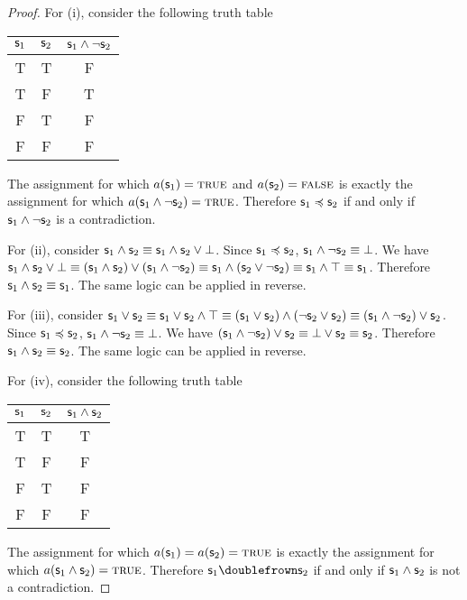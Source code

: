 \documentclass[11pt,letterpaper,fleqn]{memoir} %
\begin{document}
\begin{mathSection}
\begin{proof}
	For (i), consider the following truth table 
\begin{center}
	\begin{tabular}{c|c|c}
		$\mathsf{s}_1$ & $\mathsf{s}_2$ & $\mathsf{s}_1 \wedge \neg \mathsf{s}_2$\\
		\hline
		T & T & F \\
		T & F & T \\
		F & T & F \\
		F & F & F \\
	\end{tabular}
\end{center}
	The assignment for which $a(\mathsf{s}_1) = \textsc{true}$ and $a(\mathsf{s}_2) = \textsc{false}$ is exactly the assignment for which $a(\mathsf{s}_1 \wedge \neg \mathsf{s}_2) = \textsc{true}$. Therefore $\mathsf{s}_1 \preccurlyeq \mathsf{s}_2$ if and only if $\mathsf{s}_1 \wedge \neg \mathsf{s}_2$ is a contradiction.
	
	For (ii), consider $\mathsf{s}_1 \wedge \mathsf{s}_2 \equiv \mathsf{s}_1 \wedge \mathsf{s}_2 \vee \bot$. Since $\mathsf{s}_1 \preccurlyeq \mathsf{s}_2$, $\mathsf{s}_1 \wedge \neg \mathsf{s}_2 \equiv \bot$. We have $\mathsf{s}_1 \wedge \mathsf{s}_2 \vee \bot \equiv ( \mathsf{s}_1 \wedge \mathsf{s}_2 ) \vee (\mathsf{s}_1 \wedge \neg \mathsf{s}_2) \equiv \mathsf{s}_1 \wedge (\mathsf{s}_2 \vee \neg \mathsf{s}_2) \equiv \mathsf{s}_1 \wedge \top \equiv \mathsf{s}_1$. Therefore $\mathsf{s}_1 \wedge \mathsf{s}_2 \equiv \mathsf{s}_1$. The same logic can be applied in reverse.
	
	For (iii), consider $\mathsf{s}_1 \vee \mathsf{s}_2 \equiv \mathsf{s}_1 \vee \mathsf{s}_2 \wedge \top \equiv (\mathsf{s}_1 \vee \mathsf{s}_2) \wedge (\neg \mathsf{s}_2 \vee \mathsf{s}_2) \equiv (\mathsf{s}_1 \wedge \neg \mathsf{s}_2) \vee \mathsf{s}_2$. Since $\mathsf{s}_1 \preccurlyeq \mathsf{s}_2$, $\mathsf{s}_1 \wedge \neg \mathsf{s}_2 \equiv \bot$. We have $(\mathsf{s}_1 \wedge \neg \mathsf{s}_2) \vee \mathsf{s}_2 \equiv \bot \vee \mathsf{s}_2 \equiv \mathsf{s}_2$. Therefore $\mathsf{s}_1 \wedge \mathsf{s}_2 \equiv \mathsf{s}_2$. The same logic can be applied in reverse.
	
	For (iv), consider the following truth table 
\begin{center}
	\begin{tabular}{c|c|c}
		$\mathsf{s}_1$ & $\mathsf{s}_2$ & $\mathsf{s}_1 \wedge \mathsf{s}_2$\\
		\hline
		T & T & T \\
		T & F & F \\
		F & T & F \\
		F & F & F \\
	\end{tabular}
\end{center}
The assignment for which $a(\mathsf{s}_1) = a(\mathsf{s}_2) = \textsc{true}$ is exactly the assignment for which $a(\mathsf{s}_1 \wedge \mathsf{s}_2) = \textsc{true}$. Therefore $\stmt_1 \comp \stmt_2$ if and only if $\mathsf{s}_1 \wedge \mathsf{s}_2$ is not a contradiction.


\end{proof}
\end{mathSection}
\end{document}
